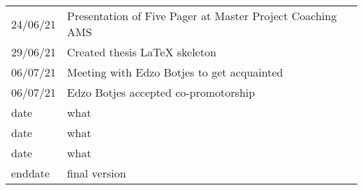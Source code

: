 \begin{table}[!h]
\begin{center}
\begin{tabularx}{\textwidth}{@{}lX@{}}
			24/06/21 & Presentation of Five Pager at Master Project Coaching AMS \\%
			29/06/21 & Created thesis LaTeX skeleton  \\%
			06/07/21 & Meeting with Edzo Botjes to get acquainted \\%
			06/07/21 & Edzo Botjes accepted co-promotorship \\%
			date    & what \\%
			date    & what \\%
			date    & what \\%
			enddate & final version \\ \bottomrule
		\end{tabularx}
		\label{tab:researchlog}
	\end{center}
\end{table}